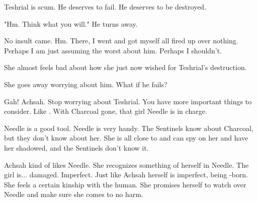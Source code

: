 Teshrial is scum. 
He deserves to fail. 
He deserves to be destroyed. 

"Hm. 
 Think what you will."
He turns away. 

No insult came. 
Hm. 
There, I went and got myself all fired up over nothing. 
Perhaps I am just assuming the worst about him. 
Perhaps I shouldn't. 

She almost feels bad about how she just now wished for Teshrial's destruction. 

She goes away worrying about him.
What if he fails?

Gah! 
Achsah. 
Stop worrying about Teshrial. 
You have more important things to consider. 
Like \Malcur. 
With Charcoal gone, that girl Needle is in charge. 

Needle is a good tool. 
Needle is very handy. 
The Sentinels know about Charcoal, but they don't know about her. 
She is all close to \Tiroco{} and can spy on her and have her shadowed, and the Sentinels don't know it. 

Achsah kind of likes Needle. 
She recognizes something of herself in Needle. 
The girl is... damaged. 
Imperfect. 
Just like Achsah herself is imperfect, being \bezed-born. 
She feels a certain kinship with the human. 
She promises herself to watch over Needle and make sure she comes to no harm. 









